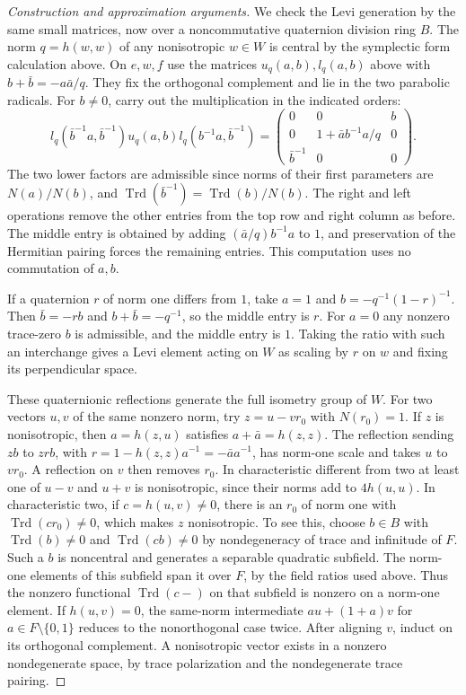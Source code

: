 \documentclass[11pt,a4paper,openany,oneside]{book}
\theoremstyle{resultstyle}
\theoremstyle{definition}
\numberwithin{equation}{chapter}
\begin{document}
\begin{proof}[Construction and approximation arguments]
We check the Levi generation by the same small matrices,
now over a noncommutative quaternion division ring \(B\).
The norm \(q=h(w,w)\) of any nonisotropic \(w\in W\)
is central by the symplectic form calculation above. On
\(e,w,f\) use the matrices \(u_q(a,b),l_q(a,b)\) above
with \(b+\bar b=-a\bar a/q\). They fix the orthogonal
complement and lie in the two parabolic radicals.
For \(b\ne0\), carry out the multiplication in the
indicated orders:
\[
 l_q(\bar b^{-1}a,\bar b^{-1})u_q(a,b)
       l_q(b^{-1}a,\bar b^{-1})
 =
 \begin{pmatrix}
  0&0&b\\
  0&1+\bar a b^{-1}a/q&0\\
  \bar b^{-1}&0&0
 \end{pmatrix}.
\]
The two lower factors are admissible since norms of
their first parameters are \(N(a)/N(b)\), and
\(\operatorname{Trd}(\bar b^{-1})=\operatorname{Trd}(b)/N(b)\).
The right and left operations remove the other entries
from the top row and right column as before. The middle
entry is obtained by adding \((\bar a/q)b^{-1}a\) to
\(1\), and preservation of the Hermitian pairing forces
the remaining entries. This computation uses no
commutation of \(a,b\).

If a quaternion \(r\) of norm one differs from \(1\),
take \(a=1\) and \(b=-q^{-1}(1-r)^{-1}\).
Then \(\bar b=-rb\) and \(b+\bar b=-q^{-1}\), so
the middle entry is \(r\). For \(a=0\) any nonzero
trace-zero \(b\) is admissible, and the middle entry
is \(1\). Taking the ratio with such an interchange
gives a Levi element acting on \(W\) as scaling by
\(r\) on \(w\) and fixing its perpendicular space.

These quaternionic reflections generate the full
isometry group of \(W\). For two vectors \(u,v\) of
the same nonzero norm, try \(z=u-vr_0\) with
\(N(r_0)=1\). If \(z\) is nonisotropic, then
\(a=h(z,u)\) satisfies \(a+\bar a=h(z,z)\).
The reflection sending \(z b\) to \(z r b\), with
\(r=1-h(z,z)a^{-1}=-\bar a a^{-1}\), has norm-one
scale and takes \(u\) to \(vr_0\). A reflection on
\(v\) then removes \(r_0\). In characteristic different
from two at least one of \(u-v\) and \(u+v\) is
nonisotropic, since their norms add to \(4h(u,u)\).
In characteristic two, if \(c=h(u,v)\ne0\), there
is an \(r_0\) of norm one with
\(\operatorname{Trd}(c r_0)\ne0\), which makes
\(z\) nonisotropic. To see this, choose \(b\in B\)
with \(\operatorname{Trd}(b)\ne0\) and
\(\operatorname{Trd}(cb)\ne0\) by nondegeneracy of
trace and infinitude of \(F\). Such a \(b\) is
noncentral and generates a separable quadratic
subfield. The norm-one elements of this subfield
span it over \(F\), by the field ratios used above.
Thus the nonzero functional \(\operatorname{Trd}(c-)\)
on that subfield is nonzero on a norm-one element.
If \(h(u,v)=0\), the same-norm intermediate
\(a u+(1+a)v\) for \(a\in F\setminus\{0,1\}\)
reduces to the nonorthogonal case twice.
After aligning \(v\), induct on its orthogonal
complement. A nonisotropic vector exists in a
nonzero nondegenerate space, by trace polarization
and the nondegenerate trace pairing.


\end{proof}
\end{document}
